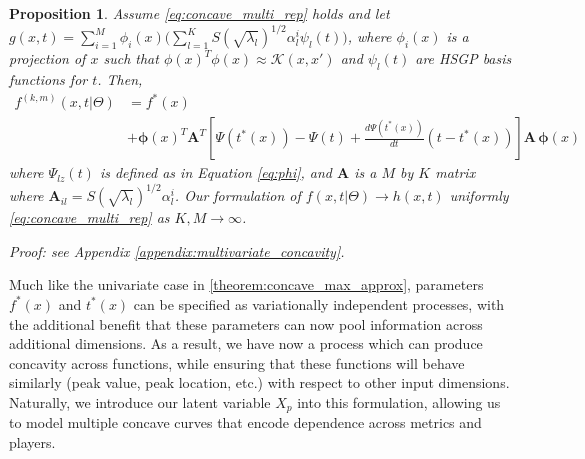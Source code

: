 \documentclass[aoas]{imsart}
\newtheorem{proposition}{Proposition}
\begin{document}
\begingroup\sloppy
\begin{proposition}\label{prop:concave_multi_gp}
Assume \eqref{eq:concave_multi_rep} holds and let $g(x,t) = \sum_{i=1}^M \phi_i(x) \bigl( \sum_{l=1}^K S(\sqrt{\lambda_l})^{1/2} \alpha_l^i \psi_l(t)\bigr)$, where $\phi_i(x)$ is a projection of $x$ such that $\phi(x)^T \phi(x) \approx \mathcal{K}(x,x')$ and $\psi_l(t)$ are HSGP basis functions for $t$. Then,
\begin{align}
\label{eq:final_gp}
    f^{(k,m)}(x,t| \Theta) &= f^{*}(x) \nonumber\\
    &+  \mathbf{\phi}(x)^T\mathbf{A}^T \!\left[ \Psi(t^{*}(x)) - \Psi(t) + \tfrac{d\Psi(t^*(x))}{dt} (t - t^{*}(x)) \right] \mathbf{A}\, \mathbf{\phi}(x)
\end{align}
%
where $\Psi_{lz}(t)$ is defined as in Equation \ref{eq:phi}, and $\mathbf{A}$ is a $M$ by $K$ matrix where $\mathbf{A}_{il} = S(\sqrt{\lambda_l})^{1/2} \alpha_l^i$. Our formulation  of $f(x, t | \Theta) \xrightarrow{} h(x,t)$ uniformly  \ref{eq:concave_multi_rep}
as $K, M \xrightarrow{} \infty$.

\noindent Proof: see Appendix \ref{appendix:multivariate_concavity}.
\end{proposition}
\endgroup

Much like the univariate case in \ref{theorem:concave_max_approx},  parameters $f^{*}(x)$ and $t^{*}(x)$ can be specified as variationally independent processes, with the additional benefit that these parameters can now pool information across additional dimensions. As a result, we have now a process which can produce concavity across functions, while ensuring that these functions will behave similarly (peak value, peak location, etc.)  with respect to other input dimensions. Naturally, we introduce our latent variable $X_p$ into this formulation, allowing us to model multiple concave curves that encode dependence across metrics and players.
\end{document}
